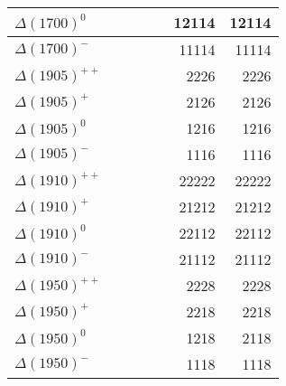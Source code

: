 \begin{tabular}{|l@{\tstrut}|r|r|r|c|r|r|}
$\Delta(1700)^0$    &   &  &  &            & 12114 & 12114 \\ \hline
$\Delta(1700)^-$    &   &  &  &            & 11114 & 11114 \\ \hline
$\Delta(1905)^{++}$ &   &  &  &            &  2226 & 2226 \\ \hline
$\Delta(1905)^+$    &   &  &  &            &  2126 & 2126 \\ \hline
$\Delta(1905)^0$    &   &  &  &            &  1216 & 1216 \\ \hline
$\Delta(1905)^-$    &   &  &  &            &  1116 & 1116 \\ \hline
$\Delta(1910)^{++}$ &   &  &  &            & 22222 & 22222 \\ \hline
$\Delta(1910)^+$    &   &  &  &            & 21212 & 21212 \\ \hline
$\Delta(1910)^0$    &   &  &  &            & 22112 & 22112 \\ \hline
$\Delta(1910)^-$    &   &  &  &            & 21112 & 21112 \\ \hline
$\Delta(1950)^{++}$ &   &  &  &            &  2228 & 2228 \\ \hline
$\Delta(1950)^+$    &   &  &  &            &  2218 & 2218 \\ \hline
$\Delta(1950)^0$    &   &  &  &            &  1218 & 2118 \\ \hline
$\Delta(1950)^-$    &   &  &  &            &  1118 & 1118 \\ \hline
\end{tabular}

\vspace{0.1in}

